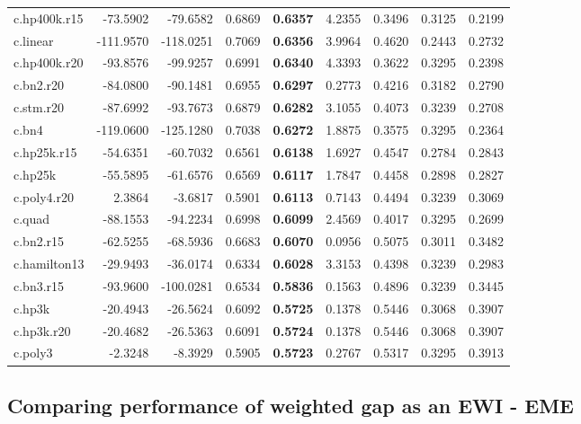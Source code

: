\documentclass[
  12pt,
]{article}
\begin{document}
\begin{table}[H]
{\begin{tabular}[t]{lrrr>{}rrrrr}
\addlinespace
c.hp400k.r15 & -73.5902 & -79.6582 & 0.6869 & \textbf{0.6357} & 4.2355 & 0.3496 & 0.3125 & 0.2199\\
c.linear & -111.9570 & -118.0251 & 0.7069 & \textbf{0.6356} & 3.9964 & 0.4620 & 0.2443 & 0.2732\\
c.hp400k.r20 & -93.8576 & -99.9257 & 0.6991 & \textbf{0.6340} & 4.3393 & 0.3622 & 0.3295 & 0.2398\\
c.bn2.r20 & -84.0800 & -90.1481 & 0.6955 & \textbf{0.6297} & 0.2773 & 0.4216 & 0.3182 & 0.2790\\
c.stm.r20 & -87.6992 & -93.7673 & 0.6879 & \textbf{0.6282} & 3.1055 & 0.4073 & 0.3239 & 0.2708\\
\addlinespace
c.bn4 & -119.0600 & -125.1280 & 0.7038 & \textbf{0.6272} & 1.8875 & 0.3575 & 0.3295 & 0.2364\\
c.hp25k.r15 & -54.6351 & -60.7032 & 0.6561 & \textbf{0.6138} & 1.6927 & 0.4547 & 0.2784 & 0.2843\\
c.hp25k & -55.5895 & -61.6576 & 0.6569 & \textbf{0.6117} & 1.7847 & 0.4458 & 0.2898 & 0.2827\\
c.poly4.r20 & 2.3864 & -3.6817 & 0.5901 & \textbf{0.6113} & 0.7143 & 0.4494 & 0.3239 & 0.3069\\
c.quad & -88.1553 & -94.2234 & 0.6998 & \textbf{0.6099} & 2.4569 & 0.4017 & 0.3295 & 0.2699\\
\addlinespace
c.bn2.r15 & -62.5255 & -68.5936 & 0.6683 & \textbf{0.6070} & 0.0956 & 0.5075 & 0.3011 & 0.3482\\
c.hamilton13 & -29.9493 & -36.0174 & 0.6334 & \textbf{0.6028} & 3.3153 & 0.4398 & 0.3239 & 0.2983\\
c.bn3.r15 & -93.9600 & -100.0281 & 0.6534 & \textbf{0.5836} & 0.1563 & 0.4896 & 0.3239 & 0.3445\\
c.hp3k & -20.4943 & -26.5624 & 0.6092 & \textbf{0.5725} & 0.1378 & 0.5446 & 0.3068 & 0.3907\\
c.hp3k.r20 & -20.4682 & -26.5363 & 0.6091 & \textbf{0.5724} & 0.1378 & 0.5446 & 0.3068 & 0.3907\\
\addlinespace
c.poly3 & -2.3248 & -8.3929 & 0.5905 & \textbf{0.5723} & 0.2767 & 0.5317 & 0.3295 & 0.3913\\
\bottomrule
\end{tabular}}
\end{table}

\hypertarget{comparing-performance-of-weighted-gap-as-an-ewi---eme}{%
\subsection{Comparing performance of weighted gap as an EWI - EME}\label{comparing-performance-of-weighted-gap-as-an-ewi---eme}}
\end{document}
